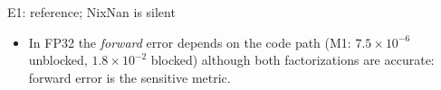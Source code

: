 \documentclass[aspectratio=169,10pt,xcolor=table]{beamer}
\begin{document}
\begin{frame}{E1: reference; NixNan is silent}
\centering\scriptsize


\vspace{3mm}\small
{}

\vspace{2mm}\footnotesize\raggedright
\begin{itemize}
\item In FP32 the \emph{forward} error depends on the code path (M1: $7.5\times10^{-6}$ unblocked, $1.8\times10^{-2}$ blocked) although both factorizations are accurate: forward error is the sensitive metric.
\end{itemize}
\end{frame}
\end{document}
